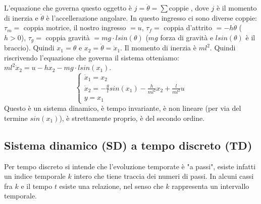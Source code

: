 L'equazione che governa questo oggetto è $j = \ddot{\theta} = \sum \text{coppie}\;$, dove $j$ è il momento di inerzia e $\ddot{\theta}$ è l'accellerazione angolare. In questo ingresso ci sono diverse coppie: $\tau_m =$ coppia motrice, il nostro ingresso $= u$, $\tau_f= $ coppia d'attrito $=-h \dot{\theta}$ ($h>0$), $\tau_g =$ coppia gravità $= mg \cdot  l sin(\theta)$ ($mg$ forza di gravità e $l sin(\theta)$ è il braccio).\newline
Quindi $x_1 = \theta$ e $x_2 = \dot{\theta} = \dot{x}_1$.\newline
Il momento di inerzia è $m l^2$.\newline
Quindi riscrivendo l'equazione che governa il sistema otteniamo: $m l^2 \dot{x}_2 = u - h x_2 - m g \cdot l sin(x_1)$.
\[
    \begin{cases}
        \dot{x}_1 = x_2\\
        \dot{x}_2 = - \frac{g}{l} sin(x_1) - \frac{h}{ml^2}x_2 + \frac{l}{ml^2}u\\
        y = x_1
    \end{cases}
\]
Questo è un sistema dinamico, è tempo invariante, è non lineare (per via del termine $sin(x_1)$), è strettamente proprio, è del secondo ordine.
\subsection{Sistema dinamico (SD) a tempo discreto (TD)}
Per tempo discreto si intende che l'evoluzione temporate è "a passi", esiste infatti un indice temporale $k$ intero che tiene traccia dei numeri di passi. In alcuni cassi fra $k$ e il tempo $t$ esiste una relazione, nel senso che $k$ rappresenta un intervallo temporale.\newline
